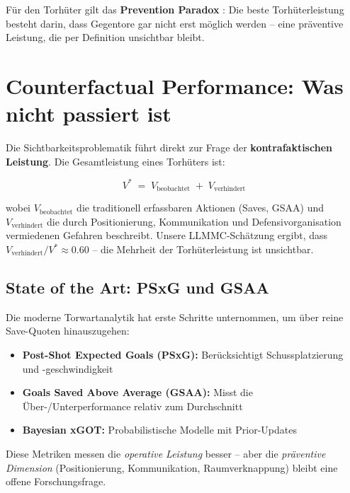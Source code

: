 \documentclass[12pt,a4paper]{article}
\begin{document}
F\"ur den Torh\"uter gilt das \textbf{Prevention Paradox} \citep{rose1985}: Die beste Torh\"uterleistung besteht darin, dass Gegentore gar nicht erst m\"oglich werden -- eine pr\"aventive Leistung, die per Definition unsichtbar bleibt.


\section{Counterfactual Performance: Was nicht passiert ist}
\label{sec:counterfactual}

Die Sichtbarkeitsproblematik f\"uhrt direkt zur Frage der \textbf{kontrafaktischen Leistung}. Die Gesamtleistung eines Torh\"uters ist:

\begin{equation}
\label{eq:counterfactual}
V^{*} \;=\; V_{\text{beobachtet}} \;+\; V_{\text{verhindert}}
\end{equation}

wobei $V_{\text{beobachtet}}$ die traditionell erfassbaren Aktionen (Saves, GSAA) und $V_{\text{verhindert}}$ die durch Positionierung, Kommunikation und Defensivorganisation vermiedenen Gefahren beschreibt. Unsere LLMMC-Sch\"atzung ergibt, dass $V_{\text{verhindert}} / V^{*} \approx 0.60$ -- die Mehrheit der Torh\"uterleistung ist unsichtbar.

\subsection{State of the Art: PSxG und GSAA}

Die moderne Torwartanalytik hat erste Schritte unternommen, um \"uber reine Save-Quoten hinauszugehen:

\begin{itemize}[nosep]
  \item \textbf{Post-Shot Expected Goals (PSxG):} Ber\"ucksichtigt Schussplatzierung und -geschwindigkeit
  \item \textbf{Goals Saved Above Average (GSAA):} Misst die \"Uber-/Unterperformance relativ zum Durchschnitt
  \item \textbf{Bayesian xGOT:} Probabilistische Modelle mit Prior-Updates
\end{itemize}

Diese Metriken messen die \emph{operative Leistung} besser -- aber die \emph{pr\"aventive Dimension} (Positionierung, Kommunikation, Raumverknappung) bleibt eine offene Forschungsfrage.
\end{document}
